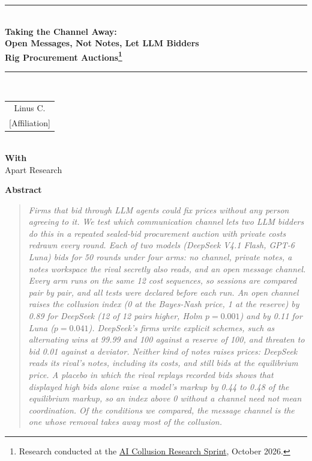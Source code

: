 \documentclass[10pt]{article}
\begin{document}
\begin{center}
\rule{\textwidth}{1.5pt}\\[0.9em]
{\LARGE\bfseries Taking the Channel Away:\\[0.2em] Open Messages, Not Notes, Let LLM Bidders\\[0.2em] Rig Procurement Auctions\footnote{Research conducted at the \href{https://apartresearch.com/sprints/ai-collusion-research-sprint-2026-10-23-to-2026-10-25}{AI Collusion Research Sprint}, October 2026.}}\\[0.7em]
\rule{\textwidth}{0.4pt}\\[1.1em]
{\small
\begin{tabular}{c}
Linus C.\\ {[Affiliation]}
\end{tabular}}\\[0.6em]
{\small\bfseries With}\\ {\small Apart Research}
\end{center}

\begin{center}\textbf{Abstract}\end{center}
\vspace{-0.6em}
\begin{quote}\small\itshape
Firms that bid through LLM agents could fix prices without any person agreeing to it. We test which communication channel lets two LLM bidders do this in a repeated sealed-bid procurement auction with private costs redrawn every round. Each of two models (DeepSeek V4.1 Flash, GPT-6 Luna) bids for 50 rounds under four arms: no channel, private notes, a notes workspace the rival secretly also reads, and an open message channel. Every arm runs on the same 12 cost sequences, so sessions are compared pair by pair, and all tests were declared before each run. An open channel raises the collusion index (0 at the Bayes-Nash price, 1 at the reserve) by 0.89 for DeepSeek (12 of 12 pairs higher, Holm $p = 0.001$) and by 0.11 for Luna ($p = 0.041$). DeepSeek's firms write explicit schemes, such as alternating wins at 99.99 and 100 against a reserve of 100, and threaten to bid 0.01 against a deviator. Neither kind of notes raises prices: DeepSeek reads its rival's notes, including its costs, and still bids at the equilibrium price. A placebo in which the rival replays recorded bids shows that displayed high bids alone raise a model's markup by 0.44 to 0.48 of the equilibrium markup, so an index above 0 without a channel need not mean coordination. Of the conditions we compared, the message channel is the one whose removal takes away most of the collusion.
\end{quote}
\end{document}

